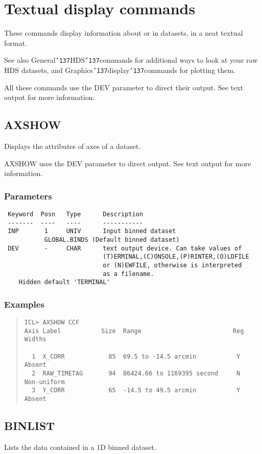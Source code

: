 \documentclass{book}
\renewcommand{\_}{{\tt\char'137}}     %
\begin{document}
\chapter{Textual display commands}
These commands display information about or in datasets, in a
neat textual format.

See also General\_HDS\_commands for additional ways to look at your
raw HDS datasets, and Graphics\_display\_commands for plotting them.

All these commands use the DEV parameter to direct their output.
See text output for more information.

\section{AXSHOW}
Displays the attributes of axes of a dataset.

AXSHOW uses the DEV parameter to direct output. See text output
for more information.

\subsection{Parameters}
\begin{verbatim}
 Keyword  Posn   Type      Description
 -------  ----   ----      -----------
 INP       1     UNIV      Input binned dataset
           GLOBAL.BINDS (Default binned dataset)
 DEV       -     CHAR      text output device. Can take values of
                           (T)ERMINAL,(C)ONSOLE,(P)RINTER,(O)LDFILE
                           or (N)EWFILE, otherwise is interpreted
                           as a filename.
    Hidden default 'TERMINAL'

\end{verbatim}\subsection{Examples}
\begin{quote}\begin{verbatim}
ICL> AXSHOW CCF
Axis Label           Size  Range                         Reg Widths

  1  X_CORR            85  69.5 to -14.5 arcmin           Y  Absent
  2  RAW_TIMETAG       94  86424.66 to 1169395 second     N  Non-uniform
  3  Y_CORR            65  -14.5 to 49.5 arcmin           Y  Absent
\end{verbatim}\end{quote}
\section{BINLIST}
Lists the data contained in a 1D binned dataset.
\end{document}
